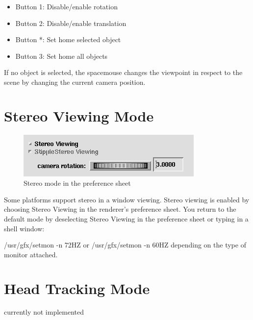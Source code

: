 \begin{itemize}
\item Button 1: Disable/enable rotation
\item Button 2: Disable/enable translation
\item Button *: Set home selected object
\item Button 3: Set home all objects
\end{itemize}

If no object is selected, the spacemouse changes the viewpoint in respect
to the scene by changing the current camera position. 

\section{Stereo Viewing Mode}


 \latexonly
 \begin{figure}[htp]
  \begin{center}
   \includegraphics[scale=0.7]{renderer/pict/image29}
   \caption{Stereo mode in the preference sheet}
	\label{fig76}
  \end{center}
 \end{figure}
 \endlatexonly
Some platforms support stereo in a window viewing. Stereo viewing is enabled
by choosing Stereo Viewing in the renderer's preference sheet. You return to
the default mode by deselecting Stereo Viewing in the preference sheet or
typing in a shell window: 

/usr/gfx/setmon -n 72HZ
or
/usr/gfx/setmon -n 60HZ
depending on the type of monitor attached. 

\section{Head Tracking Mode}

currently not implemented


